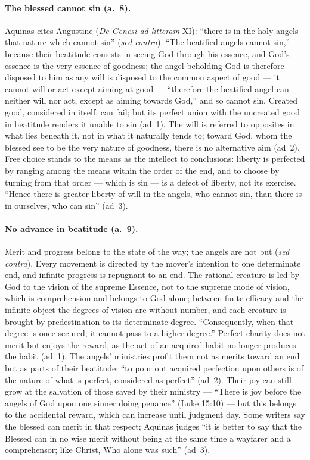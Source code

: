 \paragraph{The blessed cannot sin (a.~8).} Aquinas cites Augustine
(\emph{De Genesi ad litteram} XI): ``there is in the holy angels that
nature which cannot sin'' (\emph{sed contra}). ``The beatified angels
cannot sin,'' because their beatitude consists in seeing God through his
essence, and God's essence is the very essence of goodness; the angel
beholding God is therefore disposed to him as any will is disposed to
the common aspect of good --- it cannot will or act except aiming at
good --- ``therefore the beatified angel can neither will nor act,
except as aiming towards God,'' and so cannot sin. Created good,
considered in itself, can fail; but its perfect union with the uncreated
good in beatitude renders it unable to sin (ad~1). The will is referred
to opposites in what lies beneath it, not in what it naturally tends to;
toward God, whom the blessed see to be the very nature of goodness,
there is no alternative aim (ad~2). Free choice stands to the means as
the intellect to conclusions: liberty is perfected by ranging among the
means within the order of the end, and to choose by turning from that
order --- which is sin --- is a defect of liberty, not its exercise.
``Hence there is greater liberty of will in the angels, who cannot sin,
than there is in ourselves, who can sin'' (ad~3).

\paragraph{No advance in beatitude (a.~9).} Merit and progress belong to
the state of the way; the angels are not  but
 (\emph{sed contra}). Every movement is directed
by the mover's intention to one determinate end, and infinite progress
is repugnant to an end. The rational creature is led by God to the
vision of the supreme Essence, not to the supreme mode of vision, which
is comprehension and belongs to God alone; between finite efficacy and
the infinite object the degrees of vision are without number, and each
creature is brought by predestination to its determinate degree.
``Consequently, when that degree is once secured, it cannot pass to a
higher degree.'' Perfect charity does not merit but enjoys the reward,
as the act of an acquired habit no longer produces the habit (ad~1).
The angels' ministries profit them not as merits toward an end but as
parts of their beatitude: ``to pour out acquired perfection upon others
is of the nature of what is perfect, considered as perfect'' (ad~2).
Their joy can still grow at the salvation of those saved by their
ministry --- ``There is joy before the angels of God upon one sinner
doing penance'' (Luke 15:10) --- but this belongs to the accidental
reward, which can increase until judgment day. Some writers say the
blessed can merit in that respect; Aquinas judges ``it is better to say
that the Blessed can in no wise merit without being at the same time a
wayfarer and a comprehensor; like Christ, Who alone was such'' (ad~3).

